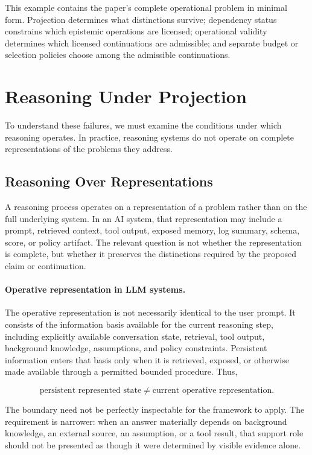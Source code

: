 \documentclass[11pt]{article}
\theoremstyle{definition}
\theoremstyle{remark}
\begin{document}
This example contains the paper's complete operational problem in minimal form. Projection determines what distinctions survive; dependency status constrains which epistemic operations are licensed; operational validity determines which licensed continuations are admissible; and separate budget or selection policies choose among the admissible continuations.

\section{Reasoning Under Projection}

To understand these failures, we must examine the conditions under which reasoning operates. In practice, reasoning systems do not operate on complete representations of the problems they address.

\subsection{Reasoning Over Representations}

A reasoning process operates on a representation of a problem rather than on the full underlying system. In an AI system, that representation may include a prompt, retrieved context, tool output, exposed memory, log summary, schema, score, or policy artifact. The relevant question is not whether the representation is complete, but whether it preserves the distinctions required by the proposed claim or continuation.

\paragraph{Operative representation in LLM systems.}
The operative representation is not necessarily identical to the user prompt. It consists of the information basis available for the current reasoning step, including explicitly available conversation state, retrieval, tool output, background knowledge, assumptions, and policy constraints. Persistent information enters that basis only when it is retrieved, exposed, or otherwise made available through a permitted bounded procedure. Thus,

\[
\boxed{
\text{persistent represented state}
\neq
\text{current operative representation}.
}
\]

The boundary need not be perfectly inspectable for the framework to apply. The requirement is narrower: when an answer materially depends on background knowledge, an external source, an assumption, or a tool result, that support role should not be presented as though it were determined by visible evidence alone.
\end{document}
